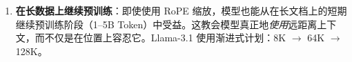 \begin{enumerate}
\begin{itemize}
  \item \textbf{线性缩放}（位置插值）~\cite{chen2023extending}：简单地将位置索引除以因子 $s$。便宜但在高扩展比时降低质量。
  \item \textbf{NTK 感知缩放}~\cite{peng2023yarn}：缩放基础频率 $\theta = 10000 \to 10000 \cdot s^{d/(d-2)}$。保留高频（局部）信息的同时扩展低频（全局）范围。
  \item \textbf{YaRN}~\cite{peng2023yarn}（Yet another RoPE extensioN）：将 NTK 缩放与注意力温度校正以及在一个小型长上下文语料上的微调结合。Llama-3 用它将 8K 训练扩展到 128K 部署。
  \item \textbf{动态 NTK（Dynamic NTK）}~\cite{peng2023yarn}：在推理时根据实际序列长度即时调整缩放因子。无需固定扩展比——模型随上下文增长而适应。
\end{itemize}
  \item \textbf{在长数据上继续预训练}：即使使用 RoPE 缩放，模型也能从在长文档上的短期继续预训练阶段（1--5B Token）中受益。这教会模型真正地\emph{使用}远距离上下文，而不仅是在位置上容忍它。Llama-3.1 使用渐进式计划：8K $\to$ 64K $\to$ 128K。

\end{enumerate}
